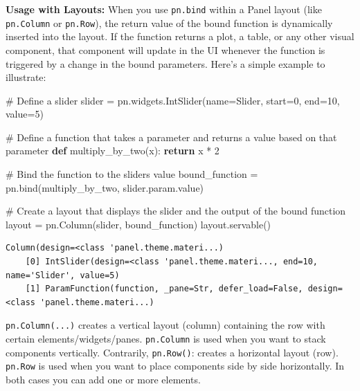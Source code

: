 \documentclass[
  letterpaper,
  DIV=11,
  numbers=noendperiod]{scrreprt}
\newenvironment{Shaded}{\begin{snugshade}}{\end{snugshade}}
\newcommand{\CommentTok}[1]{\textcolor[rgb]{0.37,0.37,0.37}{#1}}
\newcommand{\ControlFlowTok}[1]{\textcolor[rgb]{0.00,0.23,0.31}{\textbf{#1}}}
\newcommand{\DecValTok}[1]{\textcolor[rgb]{0.68,0.00,0.00}{#1}}
\newcommand{\KeywordTok}[1]{\textcolor[rgb]{0.00,0.23,0.31}{\textbf{#1}}}
\newcommand{\NormalTok}[1]{\textcolor[rgb]{0.00,0.23,0.31}{#1}}
\newcommand{\OperatorTok}[1]{\textcolor[rgb]{0.37,0.37,0.37}{#1}}
\newcommand{\StringTok}[1]{\textcolor[rgb]{0.13,0.47,0.30}{#1}}
\begin{document}
\textbf{Usage with Layouts:} When you use \texttt{pn.bind} within a
Panel layout (like \texttt{pn.Column} or \texttt{pn.Row}), the return
value of the bound function is dynamically inserted into the layout. If
the function returns a plot, a table, or any other visual component,
that component will update in the UI whenever the function is triggered
by a change in the bound parameters. Here's a simple example to
illustrate:

\begin{Shaded}
\begin{Highlighting}[]
\CommentTok{\# Define a slider}
\NormalTok{slider }\OperatorTok{=}\NormalTok{ pn.widgets.IntSlider(name}\OperatorTok{=}\StringTok{\textquotesingle{}Slider\textquotesingle{}}\NormalTok{, start}\OperatorTok{=}\DecValTok{0}\NormalTok{, end}\OperatorTok{=}\DecValTok{10}\NormalTok{, value}\OperatorTok{=}\DecValTok{5}\NormalTok{)}

\CommentTok{\# Define a function that takes a parameter and returns a value based on that parameter}
\KeywordTok{def}\NormalTok{ multiply\_by\_two(x):}
    \ControlFlowTok{return}\NormalTok{ x }\OperatorTok{*} \DecValTok{2}

\CommentTok{\# Bind the function to the slider\textquotesingle{}s value}
\NormalTok{bound\_function }\OperatorTok{=}\NormalTok{ pn.bind(multiply\_by\_two, slider.param.value)}

\CommentTok{\# Create a layout that displays the slider and the output of the bound function}
\NormalTok{layout }\OperatorTok{=}\NormalTok{ pn.Column(slider, bound\_function)}
\NormalTok{layout.servable()}
\end{Highlighting}
\end{Shaded}

\begin{verbatim}
Column(design=<class 'panel.theme.materi...)
    [0] IntSlider(design=<class 'panel.theme.materi..., end=10, name='Slider', value=5)
    [1] ParamFunction(function, _pane=Str, defer_load=False, design=<class 'panel.theme.materi...)
\end{verbatim}

\texttt{pn.Column(...)} creates a vertical layout (column) containing
the row with certain elements/widgets/panes. \texttt{pn.Column} is used
when you want to stack components vertically. Contrarily,
\texttt{pn.Row()}: creates a horizontal layout (row). \texttt{pn.Row} is
used when you want to place components side by side horizontally. In
both cases you can add one or more elements.
\end{document}
